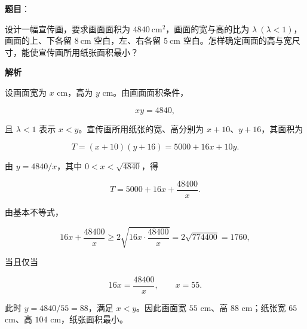 \begin{answer}

\textbf{题目}：

设计一幅宣传画，要求画面面积为 $4840\ \mathrm{cm}^2$，画面的宽与高的比为 $\lambda\ (\lambda<1)$，画面的上、下各留 $8\ \mathrm{cm}$ 空白，左、右各留 $5\ \mathrm{cm}$ 空白。怎样确定画面的高与宽尺寸，能使宣传画所用纸张面积最小？

\textbf{解析}

设画面宽为 $x$ cm，高为 $y$ cm。由画面面积条件，

\nopagebreak[4]
\[
xy=4840,
\]

且 $\lambda<1$ 表示 $x<y$。宣传画所用纸张的宽、高分别为 $x+10$、$y+16$，其面积为

\nopagebreak[4]
\[
T=(x+10)(y+16)=5000+16x+10y.
\]

由 $y=4840/x$，其中 $0<x<\sqrt{4840}$，得

\nopagebreak[4]
\[
T=5000+16x+\frac{48400}{x}.
\]

由基本不等式，

\nopagebreak[4]
\[
16x+\frac{48400}{x}\ge2\sqrt{16x\cdot\frac{48400}{x}}
=2\sqrt{774400}=1760,
\]

当且仅当

\nopagebreak[4]
\[
16x=\frac{48400}{x},\qquad x=55.
\]

此时 $y=4840/55=88$，满足 $x<y$。因此画面宽 $55$ cm、高 $88$ cm；纸张宽 $65$ cm、高 $104$ cm，纸张面积最小。


\end{answer}

